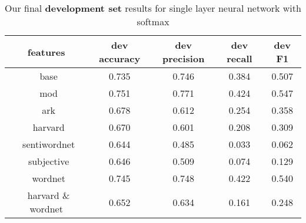 \documentclass[11pt,letterpaper]{article}
\begin{document}
\begin{table}[htp]
\begin{center}
\begin{tabularx}{347pt}{|c|c|c|c|c|}
\hline
\bf features & \bf dev accuracy &\bf dev precision &\bf dev recall & \bf dev F1 \\
\hline
\ base & 0.735 & 0.746 & 0.384 & 0.507 \\
\ mod & 0.751 & 0.771 & 0.424 & 0.547 \\
\ ark & 0.678 & 0.612 & 0.254 & 0.358 \\
\ harvard & 0.670 & 0.601 & 0.208 & 0.309 \\
\ sentiwordnet & 0.644 & 0.485 & 0.033 & 0.062 \\
\ subjective & 0.646 & 0.509 & 0.074 & 0.129 \\
\ wordnet & 0.745 & 0.748 & 0.422 & 0.540 \\
\ harvard \& wordnet & 0.652 & 0.634 & 0.161 & 0.248 \\
\hline
\end{tabularx}
\end{center}
\caption{\label{final-results-dev} Our final {\bf development set} results for single layer neural network with softmax }
\end{table}

\clearpage

\end{document}
